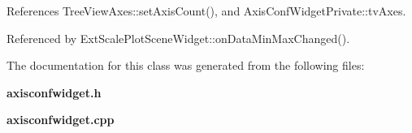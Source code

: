 References Tree\+View\+Axes\+::set\+Axis\+Count(), and Axis\+Conf\+Widget\+Private\+::tv\+Axes.



Referenced by Ext\+Scale\+Plot\+Scene\+Widget\+::on\+Data\+Min\+Max\+Changed().



The documentation for this class was generated from the following files\+:\begin{DoxyCompactItemize}
\item 
{\bf axisconfwidget.\+h}\item 
{\bf axisconfwidget.\+cpp}\end{DoxyCompactItemize}
